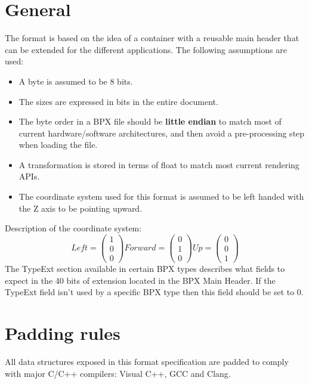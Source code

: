 \section{General}
The format is based on the idea of a container with a reusable main header that can be extended for the different applications.\newline
The following assumptions are used:
\begin{itemize}
    \item A byte is assumed to be 8 bits.
    \item The sizes are expressed in bits in the entire document.
    \item The byte order in a BPX file should be \textbf{little endian} to match most of current hardware/software architectures, and then avoid a pre-processing step when loading the file.
    \item A transformation is stored in terms of float to match most current rendering APIs.
    \item The coordinate system used for this format is assumed to be left handed with the Z axis to be pointing upward.
\end{itemize}
Description of the coordinate system:
\begin{equation}
    Left =
    \begin{pmatrix}
        1 \\
        0 \\
        0
    \end{pmatrix}
    Forward =
    \begin{pmatrix}
        0 \\
        1 \\
        0
    \end{pmatrix}
    Up =
    \begin{pmatrix}
        0 \\
        0 \\
        1
    \end{pmatrix}
\end{equation}
The TypeExt section available in certain BPX types describes what fields to expect in the 40 bits of extension located in the BPX Main Header.\newline
If the TypeExt field isn't used by a specific BPX type then this field should be set to 0.

\section{Padding rules}
All data structures exposed in this format specification are padded to comply with major C/C++ compilers: Visual C++, GCC and Clang.